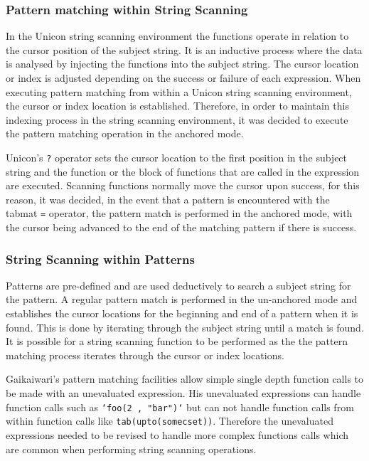 \documentclass{article}
\begin{document}
\subsubsection{Pattern matching within String Scanning}
In the Unicon string scanning environment the functions operate in relation to the cursor position of the subject string.  It is an inductive process where the data is analysed by injecting the functions into the subject string.  The cursor location or index is adjusted depending on the success or failure of each expression.  When executing pattern matching from within a Unicon string scanning environment, the cursor or index location is established.  Therefore, in order to maintain this indexing process in the string scanning environment, it was decided to execute the pattern matching operation in the anchored mode.  

Unicon's \texttt{?} operator sets the cursor location to the first position in the subject string and the function or the block of functions that are called in the expression are executed.  Scanning functions normally move the cursor upon success, for this reason, it was decided, in the event that a pattern is encountered with the tabmat \texttt{=} operator, the pattern match is performed in the anchored mode, with the cursor being advanced to the end of the matching pattern if there is success. 

\subsubsection{String Scanning within Patterns}
Patterns are pre-defined and are used deductively to search a subject string for the pattern.  A regular pattern match is performed in the un-anchored mode and establishes the cursor locations for the beginning and end of a pattern when it is found.  This is done by iterating through the subject string until a match is found.  It is possible for a string scanning function to be performed as the the pattern matching process iterates through the cursor or index locations.

Gaikaiwari's pattern matching facilities allow simple single depth function calls to be made with an unevaluated expression.  His unevaluated expressions can handle function calls such as \texttt{`foo(2 , "bar")`} but can not handle function calls from within function calls like \texttt{tab(upto(somecset))}.\cite{Gaikaiwari2005}  Therefore the unevaluated expressions needed to be revised to handle more complex functions calls which are common when performing string scanning operations.
\end{document}
